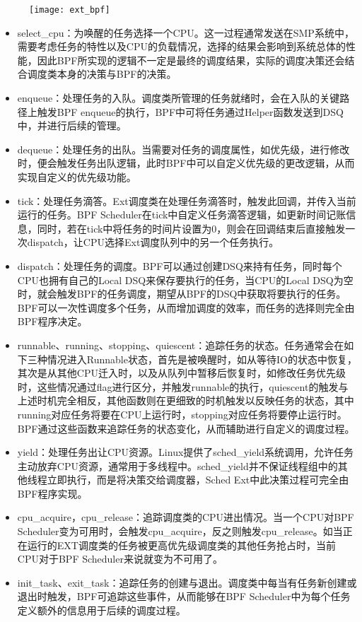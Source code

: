 \begin{figure}[!htbp]
    \centering
    \texttt{[image: ext\_bpf]}
    \label{fig:ext_bpf}
\end{figure}

\begin{itemize}
    \item select\_cpu：为唤醒的任务选择一个CPU。这一过程通常发送在SMP系统中，需要考虑任务的特性以及CPU的负载情况，选择的结果会影响到系统总体的性能，因此BPF所实现的逻辑不一定是最终的调度结果，实际的调度决策还会结合调度类本身的决策与BPF的决策。
    \item enqueue：处理任务的入队。调度类所管理的任务就绪时，会在入队的关键路径上触发BPF enqueue的执行，BPF中可将任务通过Helper函数发送到DSQ中，并进行后续的管理。
    \item dequeue：处理任务的出队。当需要对任务的调度属性，如优先级，进行修改时，便会触发任务出队逻辑，此时BPF中可以自定义优先级的更改逻辑，从而实现自定义的优先级功能。
    \item tick：处理任务滴答。Ext调度类在处理任务滴答时，触发此回调，并传入当前运行的任务。BPF Scheduler在tick中自定义任务滴答逻辑，如更新时间记账信息，同时，若在tick中将任务的时间片设置为0，则会在回调结束后直接触发一次dispatch，让CPU选择Ext调度队列中的另一个任务执行。
    \item dispatch：处理任务的调度。BPF可以通过创建DSQ来持有任务，同时每个CPU也拥有自己的Local DSQ来保存要执行的任务，当CPU的Local DSQ为空时，就会触发BPF的任务调度，期望从BPF的DSQ中获取将要执行的任务。BPF可以一次性调度多个任务，从而增加调度的效率，而任务的选择则完全由BPF程序决定。
    \item runnable、running、stopping、quiescent：追踪任务的状态。任务通常会在如下三种情况进入Runnable状态，首先是被唤醒时，如从等待IO的状态中恢复，其次是从其他CPU迁入时，以及从队列中暂移后恢复时，如修改任务优先级时，这些情况通过flag进行区分，并触发runnable的执行，quiescent的触发与上述时机完全相反，其他函数则在更细致的时机触发以反映任务的状态，其中running对应任务将要在CPU上运行时，stopping对应任务将要停止运行时。BPF通过这些函数来追踪任务的状态变化，从而辅助进行自定义的调度过程。
    \item yield：处理任务出让CPU资源。Linux提供了sched\_yield系统调用，允许任务主动放弃CPU资源，通常用于多线程中。sched\_yield并不保证线程组中的其他线程立即执行，而是将决策交给调度器，Sched Ext中此决策过程可完全由BPF程序实现。
    \item cpu\_acquire，cpu\_release：追踪调度类的CPU进出情况。当一个CPU对BPF Scheduler变为可用时，会触发cpu\_acquire，反之则触发cpu\_release。如当正在运行的EXT调度类的任务被更高优先级调度类的其他任务抢占时，当前CPU对于BPF Scheduler来说就变为不可用了。
    \item init\_task、exit\_task：追踪任务的创建与退出。调度类中每当有任务新创建或退出时触发，BPF可追踪这些事件，从而能够在BPF Scheduler中为每个任务定义额外的信息用于后续的调度过程。
\end{itemize}

